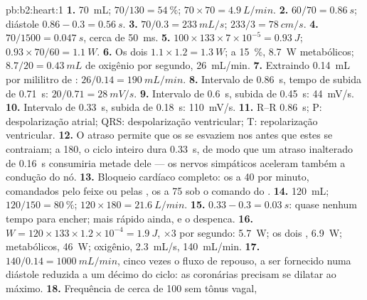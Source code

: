 \begin{solution}{pb:b2:heart:1}
\textbf{1.} \qty{70}{mL}; $70/130 = \qty{54}{\%}$; $70\times 70 =
\qty{4.9}{L/min}$.
\textbf{2.} $60/70 = \qty{0.86}{s}$; diástole $0.86 - 0.3 =
\qty{0.56}{s}$.
\textbf{3.} $70/0.3 = \qty{233}{mL/s}$; $233/3 = \qty{78}{cm/s}$.
\textbf{4.} $70/1500 = \qty{0.047}{s}$, cerca de \qty{50}{ms}.
\textbf{5.} $100\times 133\times 7\times 10^{-5} = \qty{0.93}{J}$;
$0.93\times 70/60 = \qty{1.1}{W}$.
\textbf{6.} Os dois  $1.1\times 1.2 = \qty{1.3}{W}$; a
\qty{15}{\%}, \qty{8.7}{W} metabólicos; $8.7/20 = \qty{0.43}{mL}$ de
oxigênio por segundo, \qty{26}{mL/min}.
\textbf{7.} Extraindo \qty{0.14}{mL} por mililitro de :
$26/0.14 = \qty{190}{mL/min}$.
\textbf{8.} Intervalo de \qty{0.86}{s}, tempo de subida de
\qty{0.71}{s}: $20/0.71 = \qty{28}{mV/s}$.
\textbf{9.} Intervalo de \qty{0.6}{s}, subida de \qty{0.45}{s}:
\qty{44}{mV/s}.
\textbf{10.} Intervalo de \qty{0.33}{s}, subida de \qty{0.18}{s}:
\qty{110}{mV/s}.
\textbf{11.} R--R \qty{0.86}{s}; P: despolarização atrial; QRS:
despolarização ventricular; T: repolarização ventricular.
\textbf{12.} O atraso permite que os  se esvaziem nos 
antes que estes se contraiam; a 180, o ciclo inteiro dura
\qty{0.33}{s}, de modo que um atraso inalterado de \qty{0.16}{s}
consumiria metade dele --- os nervos simpáticos aceleram também a
condução do nó.
\textbf{13.} Bloqueio cardíaco completo: os  a 40 por
minuto, comandados pelo feixe ou pelas , os  a
75 sob o comando do .
\textbf{14.} \qty{120}{mL}; $120/150 = \qty{80}{\%}$; $120\times 180 =
\qty{21.6}{L/min}$.
\textbf{15.} $0.33 - 0.3 = \qty{0.03}{s}$: quase nenhum tempo para
encher; mais rápido ainda, e o  despenca.
\textbf{16.} $W = 120\times 133\times 1.2\times 10^{-4} = \qty{1.9}{J}$,
$\times 3$ por segundo: \qty{5.7}{W}; os dois ,
\qty{6.9}{W}; metabólicos, \qty{46}{W}; oxigênio, \qty{2.3}{mL/s},
\qty{140}{mL/min}.
\textbf{17.} $140/0.14 = \qty{1000}{mL/min}$, cinco vezes o fluxo de
repouso, a ser fornecido numa diástole reduzida a um décimo do ciclo:
as  coronárias precisam se dilatar ao máximo.
\textbf{18.} Frequência de cerca de 100 sem tônus vagal, 
\end{solution}
